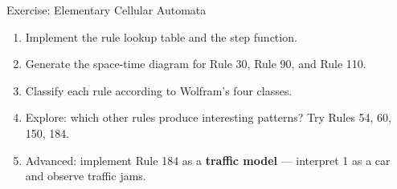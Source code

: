 \begin{frame}{Exercise: Elementary Cellular Automata}
  \begin{enumerate}
    \item Implement the rule lookup table and the step function.
    \item Generate the space-time diagram for Rule 30, Rule 90, and Rule 110.
    \item Classify each rule according to Wolfram's four classes.
    \item Explore: which other rules produce interesting patterns? Try Rules 54, 60, 150, 184.
    \item Advanced: implement Rule 184 as a \textbf{traffic model} --- interpret 1 as a car and observe traffic jams.
  \end{enumerate}
\end{frame}
